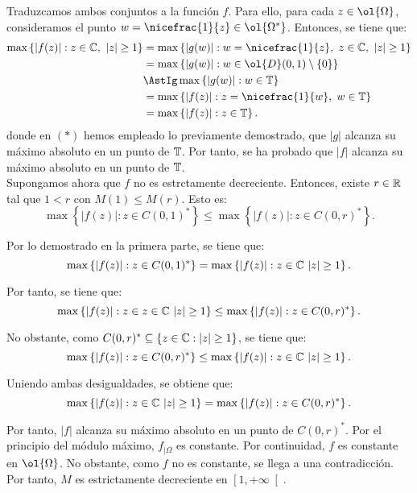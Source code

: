\begin{ejercicio}
    Traduzcamos ambos conjuntos a la función $f$. Para ello, para cada $z\in \ol{\Omega}$, consideramos el punto $w = \nicefrac{1}{z}\in \ol{\Omega^*}$. Entonces, se tiene que:
    \begin{align*}
        \max\left\{ |f(z)| : z\in \bb{C},\ |z|\geq 1 \right\} &= \max\left\{ |g(w)| : w=\nicefrac{1}{z},\ z\in \bb{C},\ |z|\geq 1 \right\} \\
        &= \max\left\{ |g(w)| : w\in \ol{D}(0,1)\setminus \{0\} \right\} \\
        &\AstIg \max\left\{ |g(w)| : w\in \bb{T} \right\}\\
        &= \max\left\{ |f(z)| : z=\nicefrac{1}{w},\ w\in \bb{T} \right\} \\
        &= \max\left\{ |f(z)| : z\in \bb{T} \right\}.
    \end{align*}
    donde en $(\ast)$ hemos empleado lo previamente demostrado, que $|g|$ alcanza su máximo absoluto en un punto de $\mathbb{T}$. Por tanto, se ha probado que $|f|$ alcanza su máximo absoluto en un punto de $\mathbb{T}$.\\

    Supongamos ahora que $f$ no es estrctamente decreciente. Entonces, existe $r\in \mathbb{R}$ tal que $1 < r$ con $M(1) \leq M(r)$. Esto es:
    \begin{equation*}
        \max\left\{ |f(z)| : z\in C(0,1)^* \right\} \leq \max\left\{ |f(z)| : z\in C(0,r)^* \right\}.
    \end{equation*}

    Por lo demostrado en la primera parte, se tiene que:
    \begin{equation*}
        \max\left\{ |f(z)| : z\in C(0,1)^* \right\} = \max\left\{ |f(z)| : z\in \mathbb{C}\ |z|\geq 1 \right\}.
    \end{equation*}

    Por tanto, se tiene que:
    \begin{equation*}
        \max\left\{ |f(z)| : z\in z\in \mathbb{C}\ |z|\geq 1 \right\} \leq \max\left\{ |f(z)| : z\in C(0,r)^* \right\}.
    \end{equation*}
    
    No obstante, como $C(0,r)^* \subseteq \{z\in \mathbb{C} : |z|\geq 1\}$, se tiene que:
    \begin{equation*}
        \max\left\{ |f(z)| : z\in C(0,r)^* \right\} \leq \max\left\{ |f(z)| : z\in \mathbb{C}\ |z|\geq 1 \right\}.
    \end{equation*}

    Uniendo ambas desigualdades, se obtiene que:
    \begin{equation*}
        \max\left\{ |f(z)| : z\in \mathbb{C}\ |z|\geq 1 \right\} = \max\left\{ |f(z)| : z\in C(0,r)^* \right\}.
    \end{equation*}

    Por tanto, $|f|$ alcanza su máximo absoluto en un punto de $C(0,r)^*$. Por el principio del módulo máximo, $f_{\big|\Omega}$ es constante. Por continuidad, $f$ es constante en $\ol{\Omega}$. No obstante, como $f$ no es constante, se llega a una contradicción. Por tanto, $M$ es estrictamente decreciente en $\left[1,+\infty\right[$.
\end{ejercicio}

